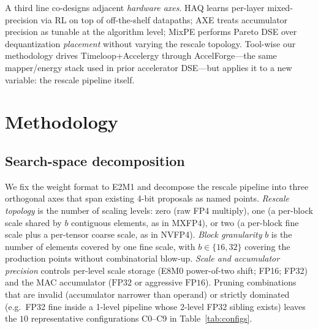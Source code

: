 \documentclass[conference]{IEEEtran}
\begin{document}
A third line co-designs adjacent \emph{hardware axes}.  HAQ
\cite{haq} learns per-layer mixed-precision via RL on top of
off-the-shelf datapaths; AXE \cite{axe} treats accumulator
precision as tunable at the algorithm level; MixPE
\cite{mixpe} performs Pareto DSE over dequantization
\emph{placement} without varying the rescale topology.
Tool-wise our methodology drives Timeloop+Accelergy
\cite{timeloop,accelergy} through AccelForge---the same
mapper/energy stack used in prior accelerator DSE---but
applies it to a new variable: the rescale pipeline itself.

\section{Methodology}
\label{sec:method}

\subsection{Search-space decomposition}

We fix the weight format to E2M1 and decompose the rescale
pipeline into three orthogonal axes that span existing 4-bit
proposals as named points.  \emph{Rescale topology} is the number
of scaling levels: zero (raw FP4 multiply), one (a per-block
scale shared by $b$ contiguous elements, as in MXFP4), or two
(a per-block fine scale plus a per-tensor coarse scale, as in
NVFP4).  \emph{Block granularity} $b$ is the number of elements
covered by one fine scale, with $b\!\in\!\{16, 32\}$ covering
the production points without combinatorial blow-up.
\emph{Scale and accumulator precision} controls per-level scale
storage (E8M0 power-of-two shift; FP16; FP32) and the MAC
accumulator ($\mathrm{FP32}$ or aggressive $\mathrm{FP16}$).
Pruning combinations that are invalid (accumulator narrower than
operand) or strictly dominated (e.g.\ FP32 fine inside a 1-level
pipeline whose 2-level FP32 sibling exists) leaves the
$10$ representative configurations C0--C9 in
Table~\ref{tab:configs}.
\end{document}
